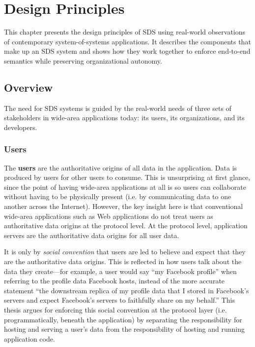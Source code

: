 \chapter{Design Principles}
\label{chap:design_principles}

This chapter presents the design
principles of SDS using real-world observations of contemporary
system-of-systems applications.
It describes the components that make up an SDS system
and shows how they work together to enforce end-to-end semantics while
preserving organizational autonomy.

\section{Overview}

The need for SDS systems is guided by the real-world needs of three sets of stakeholders in
wide-area applications today:  its users, its organizations, and its developers.

\subsection{Users}

The \textbf{users} are the authoritative origins of all data in the application.
Data is produced by users for other users to consume.  This is unsurprising at
first glance, since the point of having wide-area applications at all is so users can
collaborate without having to be physically present 
(i.e. by communicating data to one another across the Internet).  However, the
key insight here is that conventional wide-area applications such as Web
applications do not treat users as authoritative data origins at the protocol
level.  At the protocol level, application servers are the authoritative data origins for
all user data. 

It is only by \emph{social convention} that users are led to believe and
expect that they are the authoritative data origins.  This is reflected in how
users talk about the data they create---for example, a user would say ``my
Facebook profile'' when referring to the profile data Facebook hosts, instead of the more accurate
statement ``the downstream replica of my profile data that I stored in Facebook's servers and
expect Facebook's servers to faithfully share on my behalf.''
This thesis argues for enforcing this
social convention at the protocol layer (i.e. programmatically, beneath the application)
by separating the responsibility for hosting
and serving a user's data from the responsibility of hosting and running
application code.

